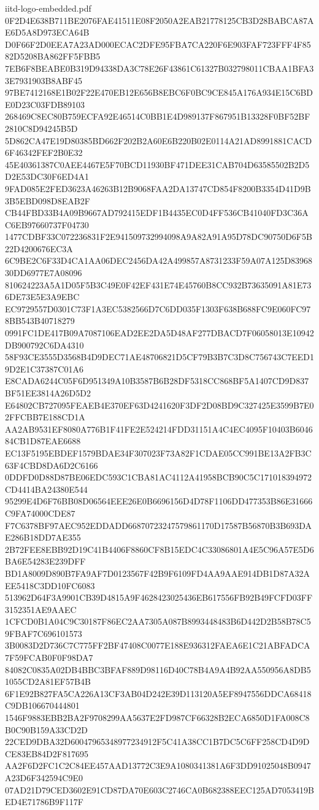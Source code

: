 \begin{filecontents*}[overwrite]{iitd-logo-embedded.pdf}
0F2D4E638B711BE2076FAE41511E08F2050A2EAB21778125CB3D28BABCA87AE6D5A8D973ECA64B
D0F66F2D0EEA7A23AD000ECAC2DFE95FBA7CA220F6E903FAF723FFF4F8582D5208BA862FF5FBB5
7EB6F8BEABE0B319D94338DA3C78E26F43861C61327B032798011CBAA1BFA33E7931903B8ABF45
97BE7412168E1B02F22E470EB12E656B8EBC6F0BC9CE845A176A934E15C6BDE0D23C03FDB89103
268469C8EC80B759ECFA92E46514C0BB1E4D989137F867951B13328F0BF52BF2810C8D94245B5D
5D862CA47E19D80385BD662F202B2A60E6B220B02E0114A21AD8991881CACD6F46342FEF2B0E32
45E40361387C0AEE4467E5F70BCD11930BF471DEE31CAB704D63585502B2D5D2E53DC30F6ED4A1
9FAD085E2FED3623A46263B12B9068FAA2DA13747CD854F8200B3354D41D9B3B5EBD098D8EAB2F
CB44FBD33B4A09B9667AD792415EDF1B4435EC0D4FF536CB41040FD3C36AC6EB97660737F04730
1477CDBF33C072236831F2E941509732994098A9A82A91A95D78DC90750D6F5B22D4200676EC3A
6C9BE2C6F33D4CA1AA06DEC2456DA42A499857A8731233F59A07A125D8396830DD6977E7A08096
810624223A5A1D05F5B3C49E0F42EF431E74E45760B8CC932B73635091A81E736DE73E5E3A9EBC
EC9729557D0301C73F1A3EC5382566D7C6DD035F1303F638B688FC9E060FC978BB543B40718279
0991FC1DE417B09A7087106EAD2EE2DA5D48AF277DBACD7F06058013E10942DB900792C6DA4310
58F93CE3555D3568B4D9DEC71AE48706821D5CF79B3B7C3D8C756743C7EED19D2E1C37387C01A6
E8CADA6244C05F6D951349A10B3587B6B28DF5318CC868BF5A1407CD9D837BF51EE3814A26D5D2
E64802CB727095FEAEB4E370EF63D4241620F3DF2D08BD9C327425E3599B7E02FFCBB7E188CD1A
AA2AB9531EF8080A776B1F41FE2E524214FDD31151A4C4EC4095F10403B604684CB1D87EAE6688
EC13F5195EBDEF1579BDAE34F307023F73A82F1CDAE05CC991BE13A2FB3C63F4CBD8DA6D2C6166
0DDFD0D88D87BE06EDC593C1CBA81AC4112A41958BCB90C5C171018394972CD4414BA24380E544
95299E4D6F76BB08D06564EEE26E0B6696156D4D78F1106DD477353B86E31666C9FA74000CDE87
F7C6378BF97AEC952EDDADD66870723247579861170D17587B56870B3B693DAE286B18DD7AE355
2B72FEE8EBB92D19C41B4406F8860CF8B15EDC4C33086801A4E5C96A57E5D6BA6E54283E239DFF
BD1A8009D890B7FA9AF7D0123567F42B9F6109FD4AA9AAE914DB1D87A32AEE5418C3DD10FC6083
513962D64F3A9901CB39D4815A9F4628423025436EB617556FB92B49FCFD03FF3152351AE9AAEC
1CFCD0B1A04C9C30187F86EC2AA7305A087B8993448483B6D442D2B58B78C59FBAF7C696101573
3B0083D2D736C7C775FF2BF47408C0077E188E936312FAEA6E1C21ABFADCA7F59FCAB0F0F98DA7
84082C0835A02DB4BBC3BFAF889D98116D40C78B4A9A4B92AA550956A8DB51055CD2A81EF57B4B
6F1E92B827FA5CA226A13CF3AB04D242E39D113120A5EF8947556DDCA68418C9DB106670444801
1546F9883EBB2BA2F9708299AA5637E2FD987CF66328B2ECA6850D1FA008C8B0C90B159A33CD2D
22CED9DBA32D60047965348977234912F5C41A38CC1B7DC5C6FF258CD4D9DCE83EB84D2F817695
AA2F6D2FC1C2C84EE457AAD13772C3E9A1080341381A6F3DD91025048B0947A23D6F342594C9E0
07AD21D79CED3602E91CD87DA70E603C2746CA0B682388EEC125AD7053419BED4E71786B9F117F

\end{filecontents*}

